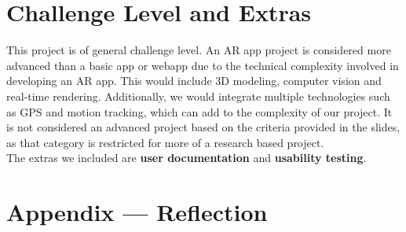 \documentclass{article}
\begin{document}
\section{Challenge Level and Extras}

This project is of general challenge level. An AR app project is considered more advanced than a basic app or webapp due to the technical complexity involved in developing an AR app. This would include 3D modeling, computer vision and real-time rendering. Additionally, we would integrate multiple technologies such as GPS and motion tracking, which can add to the complexity of our project. It is not considered an advanced project based on the criteria provided in the slides, as that category is restricted for more of a research based project.\\

The extras we included are \textbf{user documentation} and \textbf{usability testing}.\\

\newpage{}

\section*{Appendix --- Reflection}


\end{document}
